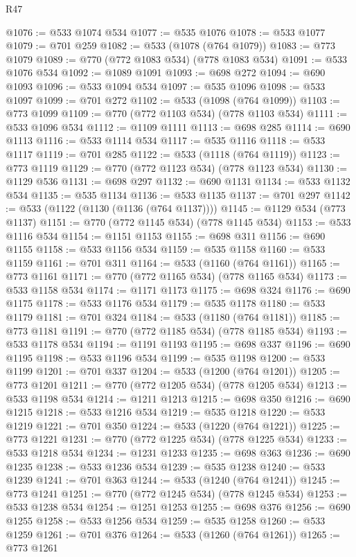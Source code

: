 \begin{lexlean}{R47}
\begin{coremodule}
@1076 := @533 @1074 @534
@1077 := @535 @1076
@1078 := @533 @1077
@1079 := @701 @259
@1082 := @533 (@1078 (@764 @1079))
@1083 := @773 @1079
@1089 := @770 (@772 @1083 @534) (@778 @1083 @534)
@1091 := @533 @1076 @534
@1092 := @1089 @1091
@1093 := @698 @272
@1094 := @690 @1093
@1096 := @533 @1094 @534
@1097 := @535 @1096
@1098 := @533 @1097
@1099 := @701 @272
@1102 := @533 (@1098 (@764 @1099))
@1103 := @773 @1099
@1109 := @770 (@772 @1103 @534) (@778 @1103 @534)
@1111 := @533 @1096 @534
@1112 := @1109 @1111
@1113 := @698 @285
@1114 := @690 @1113
@1116 := @533 @1114 @534
@1117 := @535 @1116
@1118 := @533 @1117
@1119 := @701 @285
@1122 := @533 (@1118 (@764 @1119))
@1123 := @773 @1119
@1129 := @770 (@772 @1123 @534) (@778 @1123 @534)
@1130 := @1129 @536
@1131 := @698 @297
@1132 := @690 @1131
@1134 := @533 @1132 @534
@1135 := @535 @1134
@1136 := @533 @1135
@1137 := @701 @297
@1142 := @533 (@1122 (@1130 (@1136 (@764 @1137))))
@1145 := @1129 @534 (@773 @1137)
@1151 := @770 (@772 @1145 @534) (@778 @1145 @534)
@1153 := @533 @1116 @534
@1154 := @1151 @1153
@1155 := @698 @311
@1156 := @690 @1155
@1158 := @533 @1156 @534
@1159 := @535 @1158
@1160 := @533 @1159
@1161 := @701 @311
@1164 := @533 (@1160 (@764 @1161))
@1165 := @773 @1161
@1171 := @770 (@772 @1165 @534) (@778 @1165 @534)
@1173 := @533 @1158 @534
@1174 := @1171 @1173
@1175 := @698 @324
@1176 := @690 @1175
@1178 := @533 @1176 @534
@1179 := @535 @1178
@1180 := @533 @1179
@1181 := @701 @324
@1184 := @533 (@1180 (@764 @1181))
@1185 := @773 @1181
@1191 := @770 (@772 @1185 @534) (@778 @1185 @534)
@1193 := @533 @1178 @534
@1194 := @1191 @1193
@1195 := @698 @337
@1196 := @690 @1195
@1198 := @533 @1196 @534
@1199 := @535 @1198
@1200 := @533 @1199
@1201 := @701 @337
@1204 := @533 (@1200 (@764 @1201))
@1205 := @773 @1201
@1211 := @770 (@772 @1205 @534) (@778 @1205 @534)
@1213 := @533 @1198 @534
@1214 := @1211 @1213
@1215 := @698 @350
@1216 := @690 @1215
@1218 := @533 @1216 @534
@1219 := @535 @1218
@1220 := @533 @1219
@1221 := @701 @350
@1224 := @533 (@1220 (@764 @1221))
@1225 := @773 @1221
@1231 := @770 (@772 @1225 @534) (@778 @1225 @534)
@1233 := @533 @1218 @534
@1234 := @1231 @1233
@1235 := @698 @363
@1236 := @690 @1235
@1238 := @533 @1236 @534
@1239 := @535 @1238
@1240 := @533 @1239
@1241 := @701 @363
@1244 := @533 (@1240 (@764 @1241))
@1245 := @773 @1241
@1251 := @770 (@772 @1245 @534) (@778 @1245 @534)
@1253 := @533 @1238 @534
@1254 := @1251 @1253
@1255 := @698 @376
@1256 := @690 @1255
@1258 := @533 @1256 @534
@1259 := @535 @1258
@1260 := @533 @1259
@1261 := @701 @376
@1264 := @533 (@1260 (@764 @1261))
@1265 := @773 @1261

\end{coremodule}
\end{lexlean}
